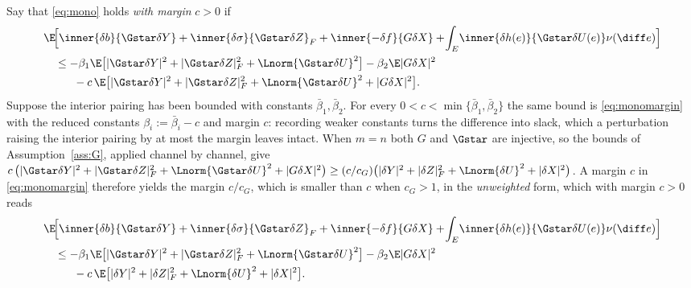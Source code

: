 \begin{remark}\label{rem:margin}
Say that \eqref{eq:mono} holds \emph{with margin} $c>0$ if
\begin{equation}\label{eq:monomargin}
\begin{aligned}
&\E\!\Big[\inner{\delta b}{\Gstar\delta Y}+\inner{\delta\sigma}{\Gstar\delta Z}_F
+\inner{-\delta f}{G\delta X}+\!\int_E\!\inner{\delta h(e)}{\Gstar\delta U(e)}\nu(\diff e)\Big]\\
&\quad\le-\beta_1\E\big[|\Gstar\delta Y|^2+|\Gstar\delta Z|_F^2+\Lnorm{\Gstar\delta U}^2\big]-\beta_2\E|G\delta X|^2\\
&\qquad\ \ -c\,\E\big[|\Gstar\delta Y|^2+|\Gstar\delta Z|_F^2+\Lnorm{\Gstar\delta U}^2+|G\delta X|^2\big] .
\end{aligned}
\end{equation}
Suppose the interior pairing has been bounded with constants $\bar\beta_1,\bar\beta_2$. For
every $0<c<\min\{\bar\beta_1,\bar\beta_2\}$ the same bound is \eqref{eq:monomargin} with the
reduced constants $\beta_i:=\bar\beta_i-c$ and margin $c$: recording weaker constants turns the
difference into slack, which a perturbation raising the interior pairing by at most the margin
leaves intact. When $m=n$ both $G$ and $\Gstar$ are injective, so the bounds of
Assumption~\ref{ass:G}, applied channel by channel, give
$c\,\bigl(|\Gstar\delta Y|^2+|\Gstar\delta Z|_F^2+\Lnorm{\Gstar\delta U}^2+|G\delta X|^2\bigr)
\ge(c/c_G)\bigl(|\delta Y|^2+|\delta Z|_F^2+\Lnorm{\delta U}^2+|\delta X|^2\bigr)$.
A margin $c$ in \eqref{eq:monomargin} therefore yields the margin $c/c_G$, which is smaller
than $c$ when $c_G>1$, in the
\emph{unweighted} form, which with margin $c>0$ reads
\begin{equation}\label{eq:monomarginu}
\begin{aligned}
&\E\!\Big[\inner{\delta b}{\Gstar\delta Y}+\inner{\delta\sigma}{\Gstar\delta Z}_F
+\inner{-\delta f}{G\delta X}+\!\int_E\!\inner{\delta h(e)}{\Gstar\delta U(e)}\nu(\diff e)\Big]\\
&\quad\le-\beta_1\E\big[|\Gstar\delta Y|^2+|\Gstar\delta Z|_F^2+\Lnorm{\Gstar\delta U}^2\big]-\beta_2\E|G\delta X|^2\\
&\qquad\ \ -c\,\E\big[|\delta Y|^2+|\delta Z|_F^2+\Lnorm{\delta U}^2+|\delta X|^2\big] .
\end{aligned}
\end{equation}
\end{remark}
